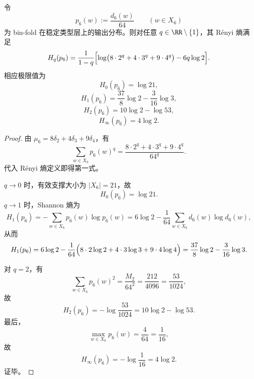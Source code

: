 \begin{theorem}\label{thm:xi-time-part9z-window6-threeatom-renyi-spectrum}
令
\[
p_6(w):=\frac{d_6(w)}{64}
\qquad (w\in X_6)
\]
为 bin-fold 在稳定类型层上的输出分布。则对任意 \(q\in\RR\setminus\{1\}\)，其 Rényi 熵满足
\[
H_q(p_6)
=
\frac{1}{1-q}
\Bigl[
\log\bigl(8\cdot 2^q+4\cdot 3^q+9\cdot 4^q\bigr)-6q\log 2
\Bigr].
\]
相应极限值为
\[
H_0(p_6)=\log 21,
\]
\[
H_1(p_6)=\frac{37}{8}\log 2-\frac{3}{16}\log 3,
\]
\[
H_2(p_6)=10\log 2-\log 53,
\]
\[
H_\infty(p_6)=4\log 2.
\]
\end{theorem}
\begin{proof}
由 \(\mu_6=8\delta_2+4\delta_3+9\delta_4\)，有
\[
\sum_{w\in X_6}p_6(w)^q
=
\frac{8\cdot 2^q+4\cdot 3^q+9\cdot 4^q}{64^q}.
\]
代入 Rényi 熵定义即得第一式。

\(q\to 0\) 时，有效支撑大小为 \(|X_6|=21\)，故
\[
H_0(p_6)=\log 21.
\]
\(q\to 1\) 时，Shannon 熵为
\[
H_1(p_6)
=
-\sum_{w\in X_6}p_6(w)\log p_6(w)
=
6\log 2-\frac{1}{64}\sum_{w\in X_6}d_6(w)\log d_6(w),
\]
从而
\[
H_1(p_6)
=
6\log 2-\frac{1}{64}\Bigl(8\cdot 2\log 2+4\cdot 3\log 3+9\cdot 4\log 4\Bigr)
=
\frac{37}{8}\log 2-\frac{3}{16}\log 3.
\]

对 \(q=2\)，有
\[
\sum_{w\in X_6}p_6(w)^2
=
\frac{M_2}{64^2}
=
\frac{212}{4096}
=
\frac{53}{1024},
\]
故
\[
H_2(p_6)=-\log\frac{53}{1024}=10\log 2-\log 53.
\]
最后，
\[
\max_{w\in X_6}p_6(w)=\frac{4}{64}=\frac{1}{16},
\]
故
\[
H_\infty(p_6)=-\log\frac{1}{16}=4\log 2.
\]
证毕。
\end{proof}

